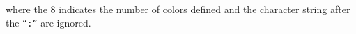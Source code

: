 \documentclass[11pt,twoside]{book}
\newcommand{\figoptions}{hbp}
\newcommand{\hitem}[1]{\item[{\bf #1} \hfill]}
\begin{document}
\noindent where the 8 indicates the number of colors defined and
the character string after the {\tt ``:''} are ignored.

%
%
%
%
\end{document}
